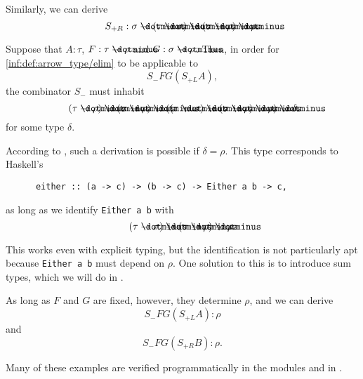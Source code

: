 \begin{example}
\begin{thmenum}
    Similarly, we can derive
    \begin{equation*}
      S_{+R}: \sigma \synimplies (\tau \synimplies \sigma) \synimplies (\sigma \synimplies \rho) \synimplies \rho.
    \end{equation*}

    Suppose that \( A: \tau \), \( F: \tau \synimplies \rho \) and \( G: \sigma \synimplies \rho \). Then, in order for \ref{inf:def:arrow_type/elim} to be applicable to
    \begin{equation*}
      S_- F G (S_{+L} A),
    \end{equation*}
    the combinator \( S_- \) must inhabit
    \begin{equation*}
      (\tau \synimplies \rho) \synimplies (\sigma \synimplies \rho) \synimplies ((\tau \synimplies \sigma) \synimplies (\sigma \synimplies \rho) \synimplies \rho) \synimplies \delta
    \end{equation*}
    for some type \( \delta \).

    According to , such a derivation is possible if \( \delta = \rho \). This type corresponds to Haskell's
    \begin{verbatim}
      either :: (a -> c) -> (b -> c) -> Either a b -> c,
    \end{verbatim}\vspace{-\baselineskip}
    as long as we identify \verb|Either a b| with
    \begin{equation*}
      (\tau \synimplies \sigma) \synimplies (\sigma \synimplies \rho) \synimplies \rho.
    \end{equation*}

    This works even with explicit typing, but the identification is not particularly apt because \verb|Either a b| must depend on \( \rho \). One solution to this is to introduce sum types, which we will do in .

    As long as \( F \) and \( G \) are fixed, however, they determine \( \rho \), and we can derive
    \begin{equation*}
      S_- F G (S_{+L} A): \rho
    \end{equation*}
    and
    \begin{equation*}
      S_- F G (S_{+R} B): \rho.
    \end{equation*}
  \end{thmenum}
\end{example}
\begin{comments}
  \item Many of these examples are verified programmatically in the modules  and  in \cite{notebook:code}.
\end{comments}

